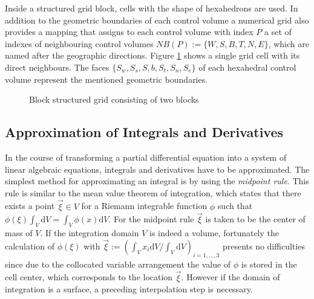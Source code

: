 Inside a structured grid block, cells with the shape of hexahedrons are used. In addition to the geometric boundaries of each control volume a numerical grid also provides a mapping that assigns to each control volume with index \(P\) a set of indexes of neighbouring control volumes \(NB(P):=\{W,S,B,T,N,E\}\), which are named after the geographic directions. Figure \ref{fig:blockstruc} shows a single grid cell with its direct neighbours. The faces \(\{S_w,S_s,S,b,S_t,S_n,S_e\}\) of each hexahedral control volume represent the mentioned geometric boundaries. 

\begin{figure}[h]
  \label{fig:blockstruc}
  \qquad
  \caption{Block structured grid consisting of two blocks}
 \end{figure}

\subsection{Approximation of Integrals and Derivatives}
\label{sec:approxintegralderivative}

In the course of transforming a partial differential equation into a system of linear algebraic equations, integrals and derivatives have to be approximated. The simplest method for approximating an integral is by using the \emph{midpoint rule}. This rule is similar to the mean value theorem of integration, which states that there exists a point \(\vec{\xi} \in V\) for a Riemann integrable function \(\phi\) such that \(\textstyle \phi(\xi) \int_V \mathrm{d}V = \int_V \phi(x) \mathrm{d}V\). For the midpoint rule \(\vec{\xi}\) is taken to be the center of mass of \(V\). If the integration domain \(V\) is indeed a volume, fortunately the calculation of \(\phi(\mathbb{\xi})\) with \(\textstyle \vec{\xi} := \left({ \int_V x_i \mathrm{d}V }/{ \int_V \mathrm{d}V } \right)_{i = 1,\dots,3}\) presents no difficulties since due to the collocated variable arrangement the value of \(\phi\) is stored in the cell center, which corresponds to the location \(\vec{\xi}\). However if the domain of integration is a surface, a preceding interpolation step is necessary.

